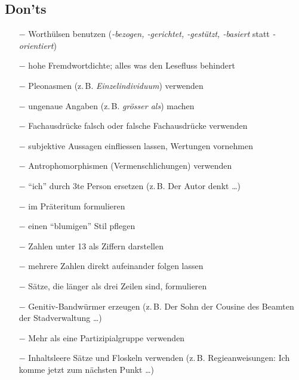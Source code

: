 \subsection{Don'ts}
\begin{itemize}\itemsep0em
	\item[$-$] Worthülsen benutzen (\textit{-bezogen, -gerichtet, -gestützt, -basiert} statt \textit{-orientiert})
	\item[$-$] hohe Fremdwortdichte; alles was den Lesefluss behindert
	\item[$-$] Pleonasmen (z.\,B. \textit{Einzelindividuum}) verwenden
	\item[$-$] ungenaue Angaben (z.\,B. \textit{grösser als}) machen
	\item[$-$] Fachausdrücke falsch oder falsche Fachausdrücke verwenden
	\item[$-$] subjektive Aussagen einfliessen lassen, Wertungen vornehmen
	\item[$-$] Antrophomorphismen (Vermenschlichungen) verwenden
	\item[$-$] \enquote{ich} durch 3te Person ersetzen (z.\,B. Der Autor denkt \dots)
	\item[$-$] im Präteritum formulieren
	\item[$-$] einen \enquote{blumigen} Stil pflegen
	\item[$-$] Zahlen unter 13 als Ziffern darstellen
	\item[$-$] mehrere Zahlen direkt aufeinander folgen lassen
	\item[$-$] Sätze, die länger als drei Zeilen sind, formulieren
	\item[$-$] Genitiv-Bandwürmer erzeugen (z.\,B. Der Sohn der Cousine des Beamten der Stadverwaltung \dots)
	\item[$-$] Mehr als eine Partizipialgruppe verwenden
	\item[$-$] Inhaltsleere Sätze und Floskeln verwenden (z.\,B. Regieanweisungen: Ich komme jetzt zum nächsten Punkt \dots)
\end{itemize}
